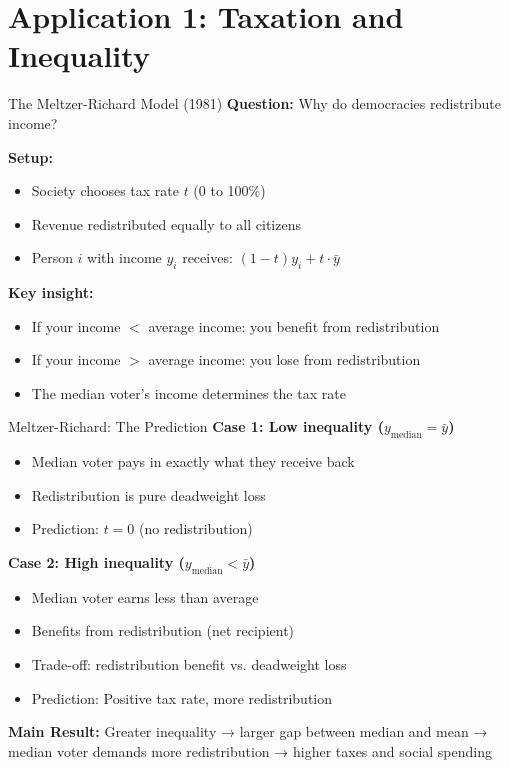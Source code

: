\documentclass[10pt]{beamer}
\begin{document}
\section{Application 1: Taxation and Inequality}

\begin{frame}{The Meltzer-Richard Model (1981)}
\textbf{Question:} Why do democracies redistribute income?



\textbf{Setup:}
\begin{itemize}
\item Society chooses tax rate $t$ (0 to 100\%)
\item Revenue redistributed equally to all citizens
\item Person $i$ with income $y_i$ receives: $(1-t)y_i + t \cdot \bar{y}$
\end{itemize}



\textbf{Key insight:}
\begin{itemize}
\item If your income $<$ average income: you benefit from redistribution
\item If your income $>$ average income: you lose from redistribution
\item The \alert{median voter's income} determines the tax rate
\end{itemize}
\end{frame}

\begin{frame}{Meltzer-Richard: The Prediction}
\textbf{Case 1: Low inequality ($y_{\text{median}} = \bar{y}$)}
\begin{itemize}
\item Median voter pays in exactly what they receive back
\item Redistribution is pure deadweight loss
\item \alert{Prediction:} $t = 0$ (no redistribution)
\end{itemize}



\textbf{Case 2: High inequality ($y_{\text{median}} < \bar{y}$)}
\begin{itemize}
\item Median voter earns less than average
\item Benefits from redistribution (net recipient)
\item Trade-off: redistribution benefit vs. deadweight loss
\item \alert{Prediction:} Positive tax rate, more redistribution
\end{itemize}



\alert{\textbf{Main Result:}} Greater inequality → larger gap between median and mean → median voter demands more redistribution → higher taxes and social spending
\end{frame}
\end{document}
